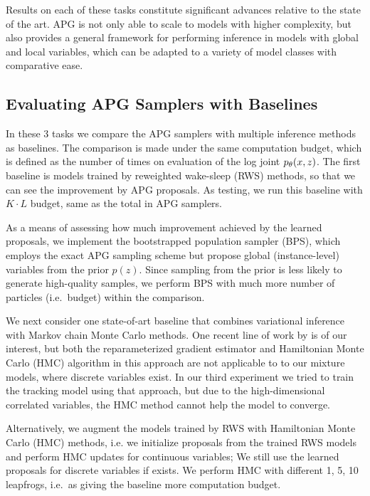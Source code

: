 \documentclass{article}
\theoremstyle{definition}
\begin{document}
Results on each of these tasks constitute significant advances relative to the state of the art. APG is not only able to scale to models with higher complexity, but also provides a general framework for performing inference in models with global and local variables, which can be adapted to a variety of model classes with comparative ease. 


\subsection{Evaluating APG Samplers with Baselines}
\label{sec:baselines}
In these 3 tasks we compare the APG samplers with multiple inference methods as baselines. The comparison is made under the same computation budget, which is defined as the number of times on evaluation of the log joint $p_\theta(x, z)$. The first baseline is models trained by reweighted wake-sleep (RWS) methods, so that we can see the improvement by APG proposals. As testing, we run this baseline with $K \cdot L$ budget, same as the total in APG samplers.


As a means of assessing how much improvement achieved by the learned proposals, we implement the bootstrapped population sampler (BPS), which employs the exact APG sampling scheme but propose global (instance-level) variables from the prior $p(z)$. Since sampling from the prior is less likely to generate high-quality samples, we perform BPS with much more number of particles (i.e.~budget) within the comparison.

We next consider one state-of-art baseline that combines variational inference with Markov chain Monte Carlo methods. One recent line of work by \citet{hoffman2017learning} is of our interest, but both the reparameterized gradient estimator and Hamiltonian Monte Carlo (HMC) algorithm in this approach are not applicable to to our mixture models, where discrete variables exist. In our third experiment we tried to train the tracking model using that approach, but due to the high-dimensional correlated variables, the HMC method cannot help the model to converge.  

Alternatively, we augment the models trained by RWS with Hamiltonian Monte Carlo (HMC) methods, i.e. we initialize proposals from the trained RWS models and perform HMC updates for continuous variables; We still use the learned proposals for discrete variables if exists. We perform HMC with different 1, 5, 10 leapfrogs, i.e.~as giving the baseline more computation budget.
\end{document}
